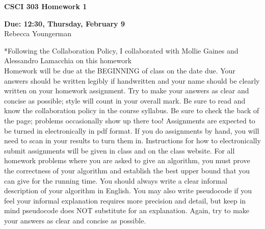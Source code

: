 \documentclass[11pt]{article}
\begin{document}
\begin{center}             %
\begin{LARGE}
{\bf CSCI 303 Homework 1}
\end{LARGE}
\vskip 0.25cm      %

\end{center}
\begin{center}




{\bf Due: 12:30, Thursday, February 9} \\  %
Rebecca Youngerman  %
\end{center}
*Following the Collaboration Policy, I collaborated with Mollie Gaines and Alessandro Lamacchia on this homework\\
Homework will be due at the BEGINNING of class on the date due. Your answers should be written
legibly if handwritten and your name should be clearly written on your homework assignment. Try to
make your answers as clear and concise as possible; style will count in your overall mark. Be sure to read
and know the collaboration policy in the course syllabus. Be sure to check the back of the page; problems
occasionally show up there too!
Assignments are expected to be turned in electronically in pdf format. If you do assignments by hand, you
will need to scan in your results to turn them in. Instructions for how to electronically submit assignments
will be given in class and on the class website.
For all homework problems where you are asked to give an algorithm, you must prove the correctness
of your algorithm and establish the best upper bound that you can give for the running time. You should
always write a clear informal description of your algorithm in English. You may also write pseudocode if
you feel your informal explanation requires more precision and detail, but keep in mind pseudocode does
NOT substitute for an explanation. Again, try to make your answers as clear and concise as possible.
\end{document}
